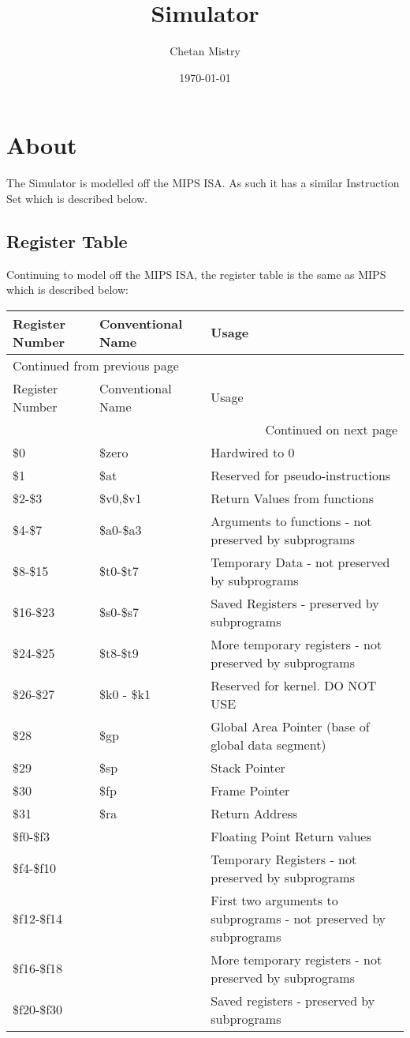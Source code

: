\documentclass[11pt]{article}
\author{Chetan Mistry}
\date{\today}
\title{Simulator}
\begin{document}
\maketitle
\tableofcontents


\section{About}
\label{sec:org4fa14b8}
The Simulator is modelled off the MIPS ISA. As such it has a similar
Instruction Set which is described below.

\subsection{Register Table}
\label{sec:org2693b2f}
Continuing to model off the MIPS ISA, the register table is the same
as MIPS which is described below:

\begin{longtable}{p{1.5cm}|p{2cm}|p{10cm}}
Register Number & Conventional Name & Usage\\
\hline
\endfirsthead
\multicolumn{3}{l}{Continued from previous page} \\
\hline

Register Number & Conventional Name & Usage \\

\hline
\endhead
\hline\multicolumn{3}{r}{Continued on next page} \\
\endfoot
\endlastfoot
\hline
\$0 & \$zero & Hardwired to 0\\
\$1 & \$at & Reserved for pseudo-instructions\\
\$2-\$3 & \$v0,\$v1 & Return Values from functions\\
\$4-\$7 & \$a0-\$a3 & Arguments to functions - not preserved by subprograms\\
\$8-\$15 & \$t0-\$t7 & Temporary Data - not preserved by subprograms\\
\$16-\$23 & \$s0-\$s7 & Saved Registers - preserved by subprograms\\
\$24-\$25 & \$t8-\$t9 & More temporary registers - not preserved by subprograms\\
\$26-\$27 & \$k0 - \$k1 & Reserved for kernel. DO NOT USE\\
\$28 & \$gp & Global Area Pointer (base of global data segment)\\
\$29 & \$sp & Stack Pointer\\
\$30 & \$fp & Frame Pointer\\
\$31 & \$ra & Return Address\\
\$f0-\$f3 &  & Floating Point Return values\\
\$f4-\$f10 &  & Temporary Registers - not preserved by subprograms\\
\$f12-\$f14 &  & First two arguments to subprograms - not preserved by subprograms\\
\$f16-\$f18 &  & More temporary registers - not preserved by subprograms\\
\$f20-\$f30 &  & Saved registers - preserved by subprograms\\
\end{longtable}
\end{document}
